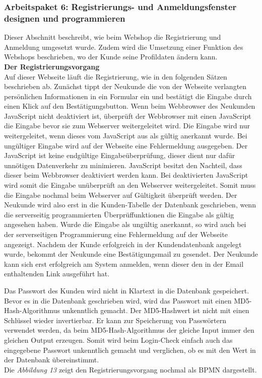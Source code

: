 \newpage
\subsubsection{Arbeitspaket 6: Registrierungs- und Anmeldungsfenster designen und programmieren}
Dieser Abschnitt beschreibt, wie beim Webshop die Registrierung und Anmeldung umgesetzt wurde. Zudem wird die Umsetzung einer Funktion des Webshops beschrieben, wo der Kunde seine Profildaten ändern kann.\\

\textbf{Der Registrierungsvorgang}\\
Auf dieser Webseite läuft die Registrierung, wie in den folgenden Sätzen beschrieben ab. Zunächst tippt der Neukunde die von der Webseite verlangten persönlichen Informationen in ein Formular ein und bestätigt die Eingabe durch einen Klick auf den Bestätigungsbutton. Wenn beim Webbrowser des Neukunden JavaScript nicht deaktiviert ist, überprüft der Webbrowser mit einen JavaScript die Eingabe bevor sie zum Webserver weitergeleitet wird. Die Eingabe wird nur weitergeleitet, wenn dieses vom JavaScript aus als gültig anerkannt wurde. Bei ungültiger Eingabe wird auf der Webseite eine Fehlermeldung ausgegeben. Der JavaScript ist keine endgültige Eingabeüberprüfung, dieser dient nur dafür unnötigen Datenverkehr zu minimieren. JavaScript besitzt den Nachteil, dass dieser beim Webbrowser deaktiviert werden kann. Bei deaktivierten JavaScript wird somit die Eingabe unüberprüft an den Webserver weitergeleitet. Somit muss die Eingabe nochmal beim Webserver auf Gültigkeit überprüft werden.  Der Neukunde wird also erst in die Kunden-Tabelle der Datenbank geschrieben, wenn die serverseitig programmierten Überprüffunktionen die Eingabe als gültig angesehen haben. Wurde die Eingabe als ungültig anerkannt, so wird auch bei der serverseitigen Programmierung eine Fehlermeldung auf der Webseite angezeigt. Nachdem der Kunde erfolgreich in der Kundendatenbank angelegt wurde, bekommt der Neukunde eine Bestätigungsmail zu gesendet. Der Neukunde kann sich erst erfolgreich am System anmelden, wenn dieser den in der Email enthaltenden Link ausgeführt hat. 

Das Passwort des Kunden wird nicht in Klartext in die Datenbank gespeichert. Bevor es in die Datenbank geschrieben wird, wird das Passwort mit einen \glqq MD5-Hash-Algorithmus\grqq{} unkenntlich gemacht. Der MD5-Hashwert ist nicht mit einen Schlüssel wieder invertierbar. Er kann zur Speicherung von Passwörtern verwendet werden, da beim \glqq MD5-Hash-Algorithmus\grqq{} der gleiche Input immer den gleichen Output erzeugen. Somit wird beim Login-Check einfach auch das eingegebene Passwort unkenntlich gemacht und verglichen, ob es mit den Wert in der Datenbank übereinstimmt.\\ Die \textit{Abbildung 13} zeigt den Registrierungsvorgang nochmal als BPMN dargestellt.\\

